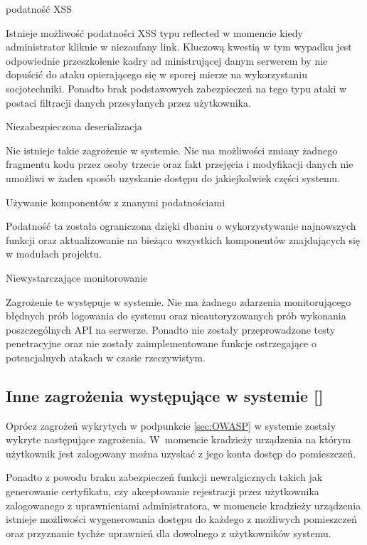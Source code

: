 \begin{enumerate*}
	 \item podatność XSS
	 
	 Istnieje możliwość podatności XSS typu reflected w momencie kiedy administrator kliknie w niezaufany link. Kluczową kwestią w tym wypadku jest odpowiednie przeszkolenie kadry ad ministrującej danym serwerem by nie dopuścić do ataku opierającego się w sporej mierze na wykorzystaniu socjotechniki. Ponadto brak podstawowych zabezpieczeń na tego typu ataki w postaci filtracji danych przesyłanych przez użytkownika. 
	 
	 \item Niezabezpieczona deserializacja
	 
	 Nie istnieje takie zagrożenie w systemie. Nie ma możliwości zmiany żadnego fragmentu kodu przez osoby trzecie oraz fakt przejęcia i modyfikacji danych nie umożliwi w żaden sposób uzyskanie dostępu do jakiejkolwiek części systemu.
	 
	 \item  Używanie komponentów z znanymi podatnościami
	 
	 Podatność ta została ograniczona dzięki dbaniu o wykorzystywanie najnowszych funkcji oraz aktualizowanie na bieżąco wszystkich komponentów znajdujących się w modułach projektu.
	 
	 \item Niewystarczające monitorowanie 
	 
	 Zagrożenie te występuje w systemie. Nie ma żadnego zdarzenia monitorującego błędnych prób logowania do systemu oraz nieautoryzowanych prób wykonania poszczególnych API na serwerze. Ponadto nie zostały przeprowadzone testy penetracyjne oraz nie zostały zaimplementowane funkcje ostrzegające o potencjalnych atakach w czasie rzeczywistym\cite{OWASP}.
\end{enumerate*}

\newpage
\subsection{Inne zagrożenia występujące w systemie [\StudentB]}

Oprócz zagrożeń wykrytych w podpunkcie \ref{sec:OWASP} w systemie zostały wykryte następujące zagrożenia. W~momencie kradzieży urządzenia na którym użytkownik jest zalogowany można uzyskać z jego konta dostęp do pomieszczeń.
 
 Ponadto z powodu braku zabezpieczeń funkcji newralgicznych takich jak generowanie certyfikatu, czy akceptowanie rejestracji przez użytkownika zalogowanego z uprawnieniami administratora, w momencie kradzieży urządzenia istnieje możliwości wygenerowania dostępu do każdego z możliwych pomieszczeń oraz przyznanie tychże uprawnień dla dowolnego z użytkowników systemu. 
 
